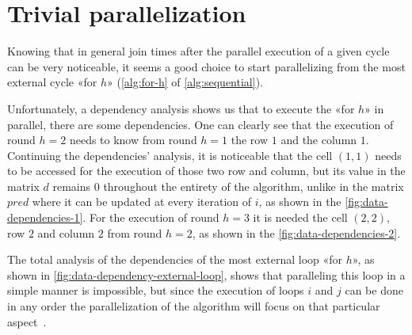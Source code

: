 \section{Trivial parallelization}\label{trivial_parallelization}

Knowing that in general join times after the parallel execution of a given cycle can be very noticeable, it seems a good choice to start parallelizing from the most external cycle «for \(h\)» (\cref{alg:for-h} of \cref{alg:sequential}).

Unfortunately, a dependency analysis shows us that to execute the «for \(h\)»  in parallel, there are some dependencies. One can clearly see that the execution of round \(h=2\) needs to know from round \(h=1\) the row \(1\) and the column \(1\). Continuing the dependencies' analysis, it is noticeable that the cell \((1,1)\) needs to be accessed for the execution of those two row and column, but its value in the matrix \(d\) remains \(0\) throughout the entirety of the algorithm, unlike in the matrix \(pred\) where it can be updated at every iteration of \( i\), as shown in the \cref{fig:data-dependencies-1}.
For the execution of round \(h=3\) it is needed the cell \((2,2)\), row \(2\) and column \(2\) from round \(h=2\), as shown in the \cref{fig:data-dependencies-2}.

The total analysis of the dependencies of the most external loop «for \(h\)», as shown in \cref{fig:data-dependency-external-loop}, shows that paralleling this loop in a simple manner is impossible, but since the execution of loops \(i\) and \(j\) can be done in any order the parallelization of the algorithm will focus on that particular aspect~\cite{rucci}.

